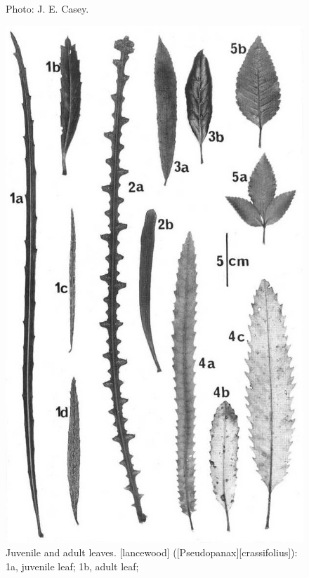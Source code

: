 \begin{figure}[!b]
\begin{minipage}[t]{\textwidth}
\begin{minipage}[t]{(\textwidth-\fgap) * \real{0.526}}
{			Photo: J. E. Casey.}%
			\label{fig:18pseudopanax}
		\end{minipage}\hspace{\fgap}%
		\begin{minipage}[t]{(\textwidth-\fgap) * \real{0.474}}
			\centering
			\includegraphics[width=\textwidth]{graphics/figure19leaves.jpg}
			\caption[Juvenile and adult leaves]{Juvenile and adult leaves.
			[lancewood] ([Pseudopanax][crassifolius]):
			1a, juvenile leaf;
			1b, adult leaf;
}
\end{minipage}
\end{minipage}
\end{figure}
